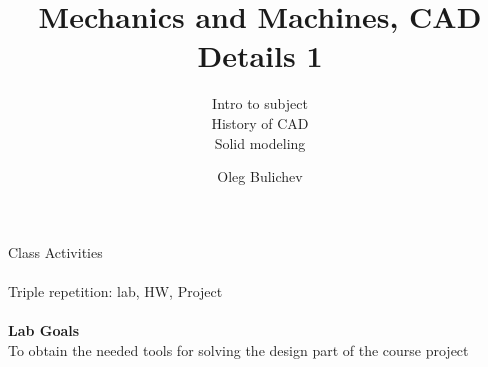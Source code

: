 \documentclass[aspectratio=169]{beamer}
\title[MaM]{Mechanics and Machines, CAD Details 1} %
\subtitle{Intro to subject
\\ History of CAD \\ Solid modeling
         } %
\author{Oleg Bulichev}
\newcommand{\fbckg}[1]{\usebackgroundtemplate{\texttt{[image: \#1]}}}%
\begin{document}
\setlength{\abovedisplayskip}{0pt}
\setlength{\belowdisplayskip}{0pt}
\setlength{\abovedisplayshortskip}{0pt}
\setlength{\belowdisplayshortskip}{0pt}

\fbckg{fibeamer/figs/title_page.png}

\fbckg{fibeamer/figs/common.png}

\note{\scriptsize \begin{itemize}
        \item \
    \end{itemize}}

\begin{frame}[c]{Class Activities}
\framesubtitle{}
    \centering \LARGE
    Triple repetition: lab, HW, Project
\end{frame}

\begin{frame}[c]{}
\framesubtitle{}
\centering \LARGE \textbf{Lab Goals} \\
To obtain the needed tools for solving the design part of the course project
\end{frame}
\end{document}
